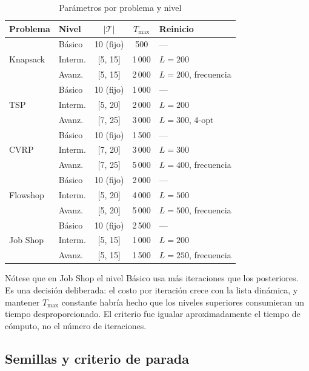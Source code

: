 \begin{table}[H]
\centering
\caption{Parámetros por problema y nivel}
\label{tab:parametros_tesis}
\small
\begin{tabular}{llccl}
\toprule
\textbf{Problema} & \textbf{Nivel} & $|\mathcal{T}|$ & $T_{\max}$ &
  \textbf{Reinicio} \\
\midrule
\multirow{3}{*}{Knapsack}
  & Básico  & 10 (fijo) & 500    & --- \\
  & Interm. & [5, 15]   & 1\,000 & $L=200$ \\
  & Avanz.  & [5, 15]   & 2\,000 & $L=200$, frecuencia \\
\midrule
\multirow{3}{*}{TSP}
  & Básico  & 10 (fijo) & 1\,000 & --- \\
  & Interm. & [5, 20]   & 2\,000 & $L=200$ \\
  & Avanz.  & [7, 25]   & 3\,000 & $L=300$, 4-opt \\
\midrule
\multirow{3}{*}{CVRP}
  & Básico  & 10 (fijo) & 1\,500 & --- \\
  & Interm. & [7, 20]   & 3\,000 & $L=300$ \\
  & Avanz.  & [7, 25]   & 5\,000 & $L=400$, frecuencia \\
\midrule
\multirow{3}{*}{Flowshop}
  & Básico  & 10 (fijo) & 2\,000 & --- \\
  & Interm. & [5, 20]   & 4\,000 & $L=500$ \\
  & Avanz.  & [5, 20]   & 5\,000 & $L=500$, frecuencia \\
\midrule
\multirow{3}{*}{Job Shop}
  & Básico  & 10 (fijo) & 2\,500 & --- \\
  & Interm. & [5, 15]   & 1\,000 & $L=200$ \\
  & Avanz.  & [5, 15]   & 1\,500 & $L=250$, frecuencia \\
\bottomrule
\end{tabular}
\end{table}

Nótese que en Job Shop el nivel Básico usa más iteraciones que los
posteriores. Es una decisión deliberada: el costo por iteración crece con la
lista dinámica, y mantener $T_{\max}$ constante habría hecho que los niveles
superiores consumieran un tiempo desproporcionado. El criterio fue igualar
aproximadamente el tiempo de cómputo, no el número de iteraciones.

\subsection{Semillas y criterio de parada}

